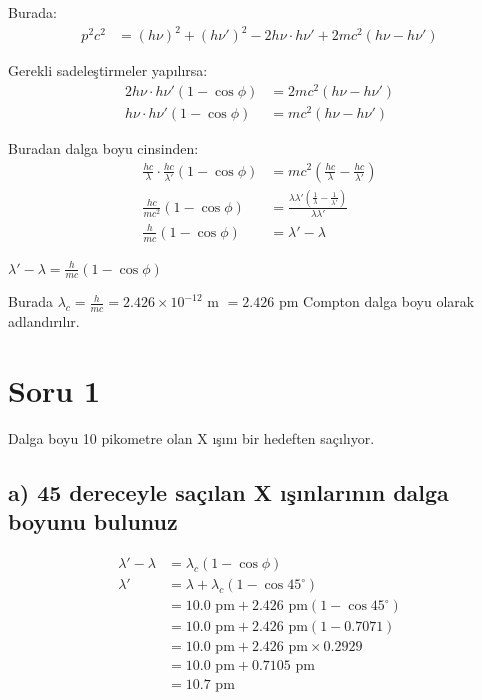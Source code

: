 \documentclass[11pt,letterpaper]{fenbil}
\begin{document}
Burada:
\begin{align}
p^2c^2 &= (h\nu)^2 + (h\nu')^2 - 2h\nu\cdot h\nu' + 2mc^2(h\nu - h\nu')
\end{align}

Gerekli sadeleştirmeler yapılırsa:
\begin{align}
2h\nu\cdot h\nu'(1-\cos\phi) &= 2mc^2(h\nu - h\nu') \\
h\nu\cdot h\nu'(1-\cos\phi) &= mc^2(h\nu - h\nu')
\end{align}

Buradan dalga boyu cinsinden:
\begin{align}
\frac{hc}{\lambda}\cdot\frac{hc}{\lambda'}(1-\cos\phi) &= mc^2\left(\frac{hc}{\lambda} - \frac{hc}{\lambda'}\right) \\
\frac{hc}{mc^2}(1-\cos\phi) &= \frac{\lambda\lambda'(\frac{1}{\lambda} - \frac{1}{\lambda'})}{\lambda\lambda'} \\
\frac{h}{mc}(1-\cos\phi) &= \lambda' - \lambda
\end{align}

\begin{tcolorbox}[title=\textbf{Compton Dalga Boyu}]
$\lambda' - \lambda = \frac{h}{mc}(1-\cos\phi)$

Burada $\lambda_c = \frac{h}{mc} = 2.426 \times 10^{-12}$ m $= 2.426$ pm Compton dalga boyu olarak adlandırılır.
\end{tcolorbox}

\section{Soru 1}

Dalga boyu 10 pikometre olan X ışını bir hedeften saçılıyor.

\subsection{a) 45 dereceyle saçılan X ışınlarının dalga boyunu bulunuz}

\begin{align}
\lambda' - \lambda &= \lambda_c(1 - \cos\phi) \\
\lambda' &= \lambda + \lambda_c(1 - \cos 45^\circ) \\
&= 10.0 \text{ pm} + 2.426 \text{ pm}(1 - \cos 45^\circ) \\
&= 10.0 \text{ pm} + 2.426 \text{ pm}(1 - 0.7071) \\
&= 10.0 \text{ pm} + 2.426 \text{ pm} \times 0.2929 \\
&= 10.0 \text{ pm} + 0.7105 \text{ pm} \\
&= 10.7 \text{ pm}
\end{align}
\end{document}
